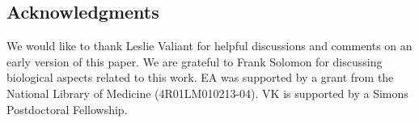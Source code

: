 \documentclass{acmtr2e}
\begin{document}
\subsection*{Acknowledgments} 
We would like to thank Leslie Valiant for helpful discussions and comments on an
early version of this paper. We are grateful to Frank Solomon for discussing
biological aspects related to this work. EA was supported by a grant from the
National Library of Medicine (4R01LM010213-04). VK is supported by a Simons
Postdoctoral Fellowship.



\end{document}
